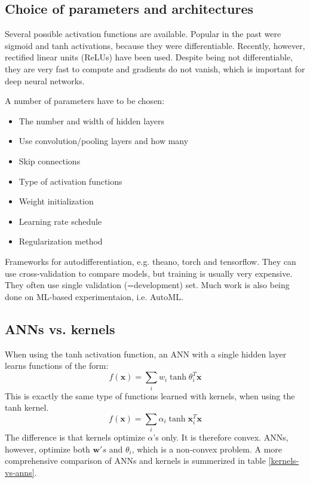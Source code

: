 \documentclass[a4paper,10pt,twoside]{article}
\begin{document}
\subsection{Choice of parameters and architectures}

Several possible activation functions are available. Popular in the past were sigmoid and tanh activations, because they were differentiable. Recently, however, rectified linear units (ReLUs) have been used. Despite being not differentiable, they are very fast to compute and gradients do not vanish, which is important for deep neural networks.

A number of parameters have to be chosen:
\begin{itemize}
    \item The number and width of hidden layers
    \item Use convolution/pooling layers and how many
    \item Skip connections
    \item Type of activation functions
    \item Weight initialization
    \item Learning rate schedule
    \item Regularization method
\end{itemize}

Frameworks for autodifferentiation, e.g. theano, torch and tensorflow. They can use cross-validation to compare models, but training is usually very expensive. They often use single validation (=development) set. Much work is also being done on ML-based experimentaion, i.e. AutoML.

\subsection{ANNs vs. kernels}

When using the tanh activation function, an ANN with a single hidden layer learns functions of the form:
\begin{equation*}
    f(\mathbf{x})=\sum_{i}w_i\tanh\theta^{T}_i\mathbf{x}
\end{equation*}
This is exactly the same type of functions learned with kernels, when using the tanh kernel.
\begin{equation*}
    f(\mathbf{x})=\sum_{i}\alpha_i\tanh\mathbf{x}_i^T\mathbf{x}
\end{equation*}
The difference is that kernels optimize $\alpha$'s only. It is therefore convex. ANNs, however, optimize both $\mathbf{w}'s$ and $\theta_i$, which is a non-convex problem. A more comprehensive comparison of ANNs and kernels is summerized in table \ref{kernels-vs-anns}.
\end{document}
